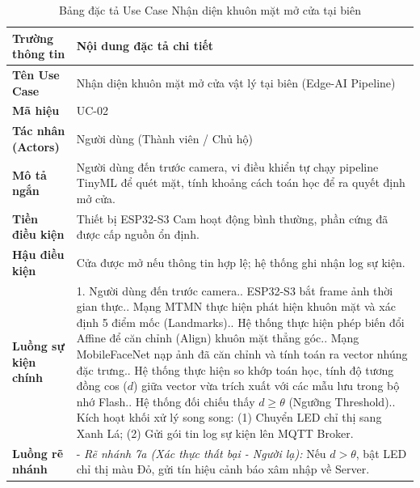 
\begin{table}[htbp]
    \centering
    \caption{Bảng đặc tả Use Case Nhận diện khuôn mặt mở cửa tại biên}
    \label{tab:spec_uc_recognition}
    \begin{tabular}{|p{3.5cm}|p{9.5cm}|}
        \hline
        \textbf{Trường thông tin} & \textbf{Nội dung đặc tả chi tiết} \\ \hline
        \textbf{Tên Use Case} & Nhận diện khuôn mặt mở cửa vật lý tại biên (Edge-AI Pipeline) \\ \hline
        \textbf{Mã hiệu} & UC-02 \\ \hline
        \textbf{Tác nhân (Actors)} & Người dùng (Thành viên / Chủ hộ) \\ \hline
        \textbf{Mô tả ngắn} & Người dùng đến trước camera, vi điều khiển tự chạy pipeline TinyML để quét mặt, tính khoảng cách toán học để ra quyết định mở cửa. \\ \hline
        \textbf{Tiền điều kiện} & Thiết bị ESP32-S3 Cam hoạt động bình thường, phần cứng đã được cấp nguồn ổn định. \\ \hline
        \textbf{Hậu điều kiện} & Cửa được mở nếu thông tin hợp lệ; hệ thống ghi nhận log sự kiện. \\ \hline
        \textbf{Luồng sự kiện chính} &
        1. Người dùng đến trước camera.\newline
        2. ESP32-S3 bắt frame ảnh thời gian thực.\newline
        3. Mạng MTMN thực hiện phát hiện khuôn mặt và xác định 5 điểm mốc (Landmarks).\newline
        4. Hệ thống thực hiện phép biến đổi Affine để căn chỉnh (Align) khuôn mặt thẳng góc.\newline
        5. Mạng MobileFaceNet nạp ảnh đã căn chỉnh và tính toán ra vector nhúng đặc trưng.\newline
        6. Hệ thống thực hiện so khớp toán học, tính độ tương đồng cos ($d$) giữa vector vừa trích xuất với các mẫu lưu trong bộ nhớ Flash.\newline
        7. Hệ thống đối chiếu thấy $d \ge \theta$ (Ngưỡng Threshold).\newline
        8. Kích hoạt khối xử lý song song: (1) Chuyển LED chỉ thị sang Xanh Lá; (2) Gửi gói tin log sự kiện lên MQTT Broker. \\ \hline
        \textbf{Luồng rẽ nhánh} &
        - \textit{Rẽ nhánh 7a (Xác thực thất bại - Người lạ):} Nếu $d > \theta$, bật LED chỉ thị màu Đỏ, gửi tín hiệu cảnh báo xâm nhập về Server. \\ \hline
    \end{tabular}
\end{table}